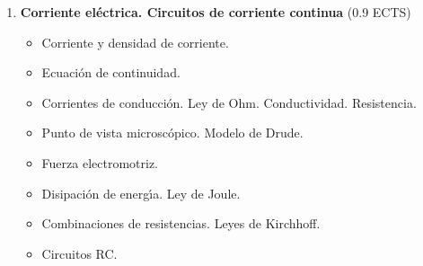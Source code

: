 \begin{enumerate}[{\bf 1. }]
\begin{itemize}
\end{itemize}



\item {\bf Corriente el\'{e}ctrica. Circuitos de corriente continua} \hfill (0.9 ECTS)
\begin{itemize} \addtolength{\itemsep}{-0.25\baselineskip}
\noindent
\item   Corriente y densidad de corriente.
\item  Ecuaci\'{o}n de continuidad.
\item  Corrientes de conducci\'{o}n. Ley de Ohm. Conductividad. Resistencia.
\item  Punto de vista microsc\'{o}pico. Modelo de Drude.
\item  Fuerza electromotriz.
\item  Disipaci\'{o}n de energ\'{\i}a. Ley de Joule.
\item  Combinaciones de resistencias. Leyes de Kirchhoff.
\item  Circuitos RC.
\end{itemize}



\end{enumerate}

